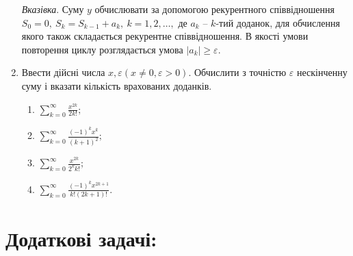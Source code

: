 \documentclass[a5paper,titlepage,openany,twoside,draft]{book_unv}%
\makeatletter
\newcommand{\xslalph}[1]{\expandafter\@xslalph\csname c@#1\endcsname}
\newcommand{\@xslalph}[1]{%
    \ifcase#1\or а\or б\or в\or г\or д\or e\or є\or ж\or з\or i%
    \or й\or к\or л\or м\or н\or о\or п\or р\or с\or т%
    \or у\or ф\or х\or ц\or ч\or ш\or ю\or я\or аа\or бб\or вв%
    \else\@ctrerr\fi%
}
\makeatother
\begin{document}
\begin{enumerate}
\begin{enumerate}[label=\xslalph*)]
\end{enumerate}

\emph{\emph{Вказівка}}. Суму $y$ обчислювати за допомогою
рекурентного співвідношення
\(S_{0} = 0,\ S_{k} = S_{k - 1} + a_{k},\ k = 1,2,\ldots,\) де
\(a_{k}\) -- \(k\)-тий доданок, для обчислення якого також складається
рекурентне співвідношення. В якості умови повторення циклу розглядається
умова \(\left| a_{k} \right| \geq \varepsilon.\)

\item
  Ввести дійсні числа
  \(x,\varepsilon (x \neq 0,\varepsilon > 0)\). Обчислити з
  точністю \(\varepsilon\) нескінченну суму і вказати кількість
  врахованих доданків.
  \begin{multicols}{2}
\begin{enumerate}[label=\xslalph*)]
\item \(\sum\limits_{k = 0}^{\infty}\frac{x^{2k}}{2k!};\) 
\item \(\sum\limits_{k = 0}^{\infty}\frac{(-1)^{k}x^{k}}{(k + 1)^{2}};\)
\item \(\sum\limits_{k = 0}^{\infty}\frac{x^{2k}}{2^{k}k!};\) 
\item \(\sum\limits_{k = 0}^{\infty}\frac{(-1)^{k}x^{2k + 1}}{k!(2k + 1)!}.\)
\end{enumerate}
 \end{multicols}

\end{enumerate}

\section{Додаткові задачі:}
\end{document}
